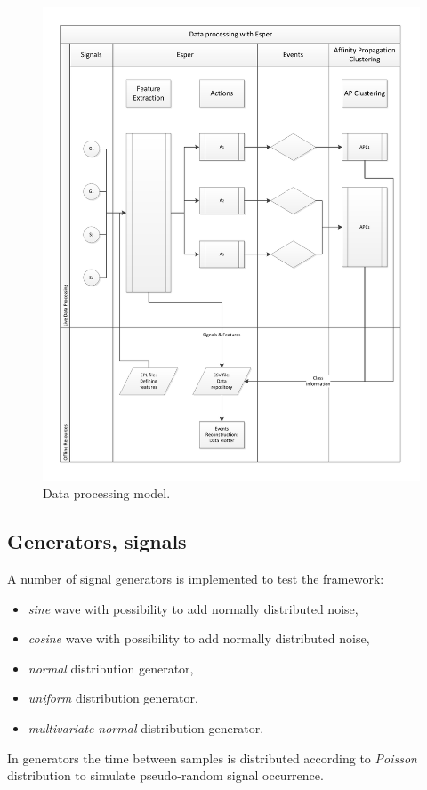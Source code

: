 \documentclass[11pt, letterpaper]{article}            %
\begin{document}
\begin{figure}[htbp]
    \centering
    \includegraphics[width=\textwidth]{./gfx/model.pdf}
  \caption{Data processing model.\label{fig:model}}
\end{figure}

\subsection{Generators, signals\label{sec:generators}}
A number of signal generators is implemented to test the framework:
\begin{itemize}
    \item \emph{sine} wave with possibility to add normally distributed noise,
    \item \emph{cosine} wave with possibility to add normally distributed noise,
    \item \emph{normal} distribution generator,
    \item \emph{uniform} distribution generator,
    \item \emph{multivariate normal} distribution generator.
\end{itemize}
In generators the time between samples is distributed according to \emph{Poisson} distribution to simulate pseudo-random signal occurrence.\\
\end{document}
